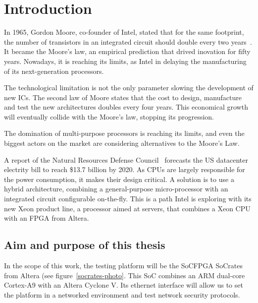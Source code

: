 \chapter{Introduction}
In 1965, Gordon Moore, co-founder of Intel, stated that for the same footprint, the number of transistors in an integrated circuit should double every two years~\cite{moore1965}.
It became the Moore's law, an empirical prediction that drived inovation for fifty years.
Nowadays, it is reaching its limits, as Intel in delaying the manufacturing of its next-generation processors.

The technological limitation is not the only parameter slowing the development of new ICs.
The second law of Moore states that the cost to design, manufacture and test the new architectures doubles every four years.
This economical growth will eventually collide with the Moore's law, stopping its progression.

The domination of multi-purpose processors is reaching its limits, and even the biggest actors on the market are considering alternatives to the Moore's Law.

\noindent A report of the Natural Resources Defense Council~\cite{nrdc2014} forecasts the US datacenter electrity bill to reach \$13.7 billion by 2020.
As CPUs are largely responsible for the power consumption, it makes their design critical.
A solution is to use a hybrid architecture, combining a general-purpose micro-processor with an integrated circuit configurable on-the-fly.
This is a path Intel is exploring with its new Xeon product line, a processor aimed at servers, that combines a Xeon CPU with an FPGA from Altera\cite{xeon2014}.\newline{}




\section{Aim and purpose of this thesis}













In the scope of this work, the testing platform will be the SoCFPGA SoCrates from Altera (see figure~\ref{socrates-photo}.
This SoC combines an ARM dual-core Cortex-A9 with an Altera Cyclone V.
Its ethernet interface will allow us to set the platform in a networked environment and test network security protocols.

